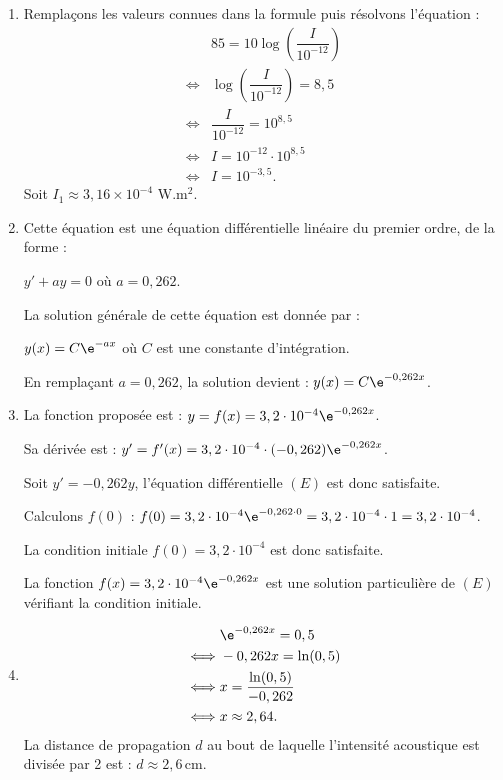 \medskip

\begin{enumerate}
\item Remplaçons les valeurs connues dans la formule puis résolvons l'équation :
\begin{align*}
&85 = 10 \log \left(\dfrac{I}{10^{-12}}\right) \\
\iff &\log \left(\dfrac{I}{10^{-12}}\right) = 8,5 \\
\iff &\dfrac{I}{10^{-12}} = 10^{8,5} \\
\iff &I = 10^{-12} \cdot 10^{8,5} \\
\iff &I = 10^{-3,5}.
\end{align*}
Soit $I_1 \approx 3,16 \times 10^{-4}$ W.m$^2$.

\item Cette équation est une équation différentielle linéaire du premier ordre, de la forme :

$y' + ay = 0$ où $a = 0,262$.

La solution générale de cette équation est donnée par :

$y(x) = C \e^{-ax}$ où $C$ est une constante d'intégration.

En remplaçant $a = 0,262$, la solution devient : $y(x) = C \e^{-0,262x}$.

\item La fonction proposée est :
$y = f(x) = 3,2 \cdot 10^{-4} \e^{-0,262x}$.

Sa dérivée est :
$y' = f'(x) = 3,2 \cdot 10^{-4} \cdot (-0,262) \e^{-0,262x}$.

Soit $y' = -0,262y$, l'équation différentielle $(E)$ est donc satisfaite.

Calculons $f(0)$ :
$f(0) = 3,2 \cdot 10^{-4} \e^{-0,262 \cdot 0} = 3,2 \cdot 10^{-4} \cdot 1 = 3,2 \cdot 10^{-4}$.

La condition initiale $f(0) = 3,2 \cdot 10^{-4}$ est donc satisfaite.

La fonction $f(x) = 3,2 \cdot 10^{-4} \e^{-0,262x}$ est une solution particulière de $(E)$ vérifiant la condition initiale.

\item
\begin{align*}
&\e^{-0,262x} = 0,5 \\
\iff &-0,262x = \ln(0,5) \\
\iff &x = \dfrac{\ln(0,5)}{-0,262} \\
\iff &x \approx 2,64.
\end{align*}
La distance de propagation $d$ au bout de laquelle l'intensité acoustique est divisée par 2 est :
$d \approx 2,6 \, \text{cm}.$
\end{enumerate}

\bigskip
